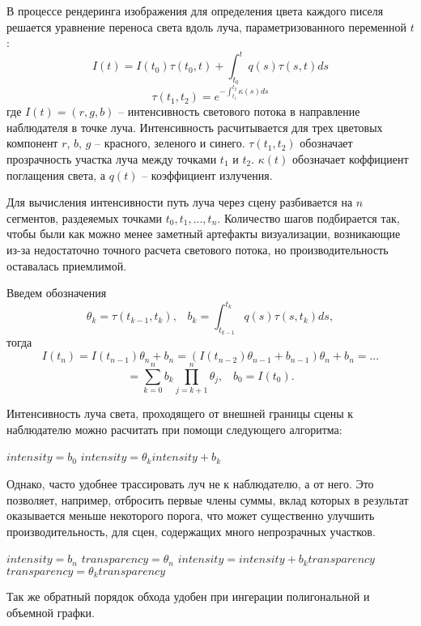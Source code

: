 В процессе рендеринга изображения для определения цвета каждого писеля решается уравнение переноса света вдоль луча, параметризованного переменной $t$: 
$$ I(t) = I(t_0)\tau(t_0, t) + \int_{t_0}^t q(s)\tau(s, t) ds $$
$$ \tau(t_1, t_2) = e^{-\int_{t_1}^{t_2} \kappa(s)ds} $$
где $I(t)=(r, g, b)$ -- интенсивность светового потока в направление наблюдателя в точке луча. Интенсивность расчитывается для трех цветовых компонент $r$, $b$, $g$ -- красного, зеленого и синего. $\tau(t_1, t_2)$ обозначает прозрачность участка луча между точками $t_1$ и $t_2$. $\kappa(t)$ обозначает коффициент поглащения света, а $q(t)$ -- коэффициент излучения.

Для вычисления интенсивности путь луча через сцену разбивается на $n$  сегментов, раздеяемых точками ${t_0, t_1, ..., t_n}$. Количество шагов подбирается так, чтобы были как можно менее заметный артефакты визуализации, возникающие из-за недостаточно точного расчета светового потока, но производительность оставалась приемлимой.

Введем обозначения $$ \theta_k = \tau(t_{k-1}, t_k), \;\;\; b_k = \int_{t_{k-1}}^{t_k}\! q(s)\tau(s, t_k) ds, $$ тогда $$ I(t_n) = I(t_{n-1})\theta_n + b_n = (I(t_{n-2})\theta_{n-1} + b_{n-1})\theta_n + b_n = ...$$ 
$$ = \sum_{k=0}^n b_k \prod_{j=k+1}^n \theta_j, \;\;\; b_0 = I(t_0).$$

Интенсивность луча света, проходящего от внешней границы сцены к наблюдателю можно расчитать при помощи следующего алгоритма:

\begin{algorithmic}
\STATE $intensity = b_0$
\STATE $intensity = \theta_k intensity + b_k$
\ENDFOR
\end{algorithmic}

Однако, часто удобнее трассировать луч не к наблюдателю, а от него. Это позволяет, например, отбросить первые члены суммы, вклад которых в результат оказывается меньше некоторого порога, что может существенно улучшить производительность, для сцен, содержащих много непрозрачных участков.

\begin{algorithmic}
\STATE $intensity = b_n$
\STATE $transparency = \theta_n$
\STATE $intensity = intensity + b_k transparency$
\STATE $transparency = \theta_k transparency$
\ENDFOR
\end{algorithmic}

Так же обратный порядок обхода удобен при ингерации полигональной и объемной графки.

